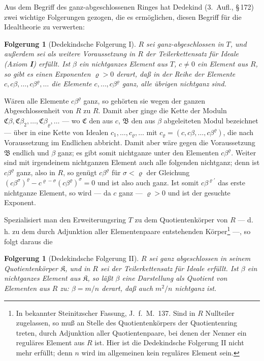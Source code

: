 \documentclass[12pt,a4paper]{article}
\newcommand{\fB}{\mathfrak{B}}
\newcommand{\fC}{\mathfrak{C}}
\newcommand{\fK}{\mathfrak{K}}
\theoremstyle{plain}
\newtheorem{Folgerung}[Satz]{Folgerung}
\theoremstyle{definition}
\theoremstyle{remark}
\begin{document}
Aus dem Begriff des ganz-abgeschlossenen Ringes hat Dedekind (3.~Aufl., \S\,172) zwei wichtige Folgerungen gezogen, die es ermöglichen, diesen Begriff für die Idealtheorie zu verwerten:

\begin{Folgerung}[Dedekindsche Folgerung I]
$R$ sei ganz-abgeschlossen in $T$, und außerdem sei als weitere Voraussetzung in $R$ der Teilerkettensatz für Ideale (Axiom \textbf{I}) erfüllt. Ist $\beta$ ein nichtganzes Element aus $T$, $c \neq 0$ ein Element aus $R$, so gibt es einen Exponenten $\varrho > 0$ derart, daß in der Reihe der Elemente $c, c\beta,\dots,c\beta^{\varrho},\dots$ die Elemente $c,\dots,c\beta^{\varrho}$ ganz, alle übrigen nichtganz sind.
\end{Folgerung}

Wären alle Elemente $c\beta^{\varrho}$ ganz, so gehörten sie wegen der ganzen Abgeschlossenheit von $R$ zu $R$. Damit aber ginge die Kette der Moduln $\fC\beta, \fC\beta_{2},\dots,\fC\beta_{\varrho},\dots$ --- wo $\fC$ den aus $c$, $\fB$ den aus $\beta$ abgeleiteten Modul bezeichnet --- über in eine Kette von Idealen $c_{1},\dots,c_{\varrho},\dots$ mit $c_{\varrho} = (c, c\beta,\dots,c\beta^{\varrho})$, die nach Voraussetzung im Endlichen abbricht. Damit aber wäre gegen die Voraussetzung $\fB$ endlich und $\beta$ ganz; es gibt somit nichtganze unter den Elementen $c\beta^{\varrho}$. Weiter sind mit irgendeinem nichtganzen Element auch alle folgenden nichtganz; denn ist $c\beta^{\varrho}$ ganz, also in $R$, so genügt $c\beta^{\varrho}$ für $\sigma < \varrho$ der Gleichung $(c\beta^{\sigma})^{\varrho} - c^{\varrho-\sigma}(c\beta^{\varrho})^{\sigma} = 0$ und ist also auch ganz. Ist somit $c\beta^{\varrho'}$ das erste nichtganze Element, so wird --- da $c$ ganz --- $\varrho > 0$ und ist der gesuchte Exponent.

Spezialisiert man den Erweiterungsring $T$ zu dem Quotientenkörper von $R$ --- d.\,h. zu dem durch Adjunktion aller Elementenpaare entstehenden Körper\footnote{In bekannter Steinitzscher Fassung, J.~f.~M.\ 137. Sind in $R$ Nullteiler zugelassen, so muß an Stelle des Quotientenkörpers der Quotientenring treten, durch Adjunktion aller Quotientenpaare, bei denen der Nenner ein reguläres Element aus $R$ ist. Hier ist die Dedekindsche Folgerung II nicht mehr erfüllt; denn $n$ wird im allgemeinen kein reguläres Element sein.} ---, so folgt daraus die

\begin{Folgerung}[Dedekindsche Folgerung II]
$R$ sei ganz abgeschlossen in seinem Quotientenkörper $\fK$, und in $R$ sei der Teilerkettensatz für Ideale erfüllt. Ist $\beta$ ein nichtganzes Element aus $\fK$, so läßt $\beta$ eine Darstellung als Quotient von Elementen aus $R$ zu: $\beta = m/n$ derart, daß auch $m^{2}/n$ nichtganz ist.
\end{Folgerung}
\end{document}
